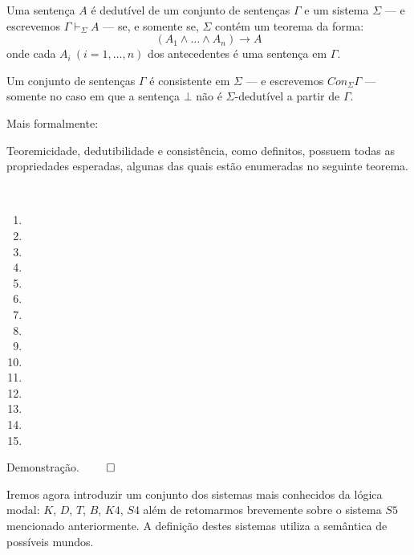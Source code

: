 Uma sentença $A$ é dedutível de um conjunto de
sentenças $\Gamma$ e um sistema $\Sigma$ --- e escrevemos $\Gamma
\vdash_{\Sigma} A$ --- se, e somente se, $\Sigma$ contém um teorema da forma:
\begin{equation}
    (A_1 \wedge \ldots \wedge A_n) \rightarrow A
\end{equation}
onde cada $A_i~(i=1,\ldots,n)$ dos antecedentes é uma sentença em $\Gamma$.

Um conjunto de sentenças $\Gamma$ é consistente em $\Sigma$ --- e escrevemos
$Con_{\Sigma}\Gamma$ --- somente no caso em que a sentença $\bot$ não é
$\Sigma$-dedutível a partir de $\Gamma$.

Mais formalmente:

\begin{definition}[Dedutibilidade]
    
\end{definition}

\begin{definition}[Consistência]
    
\end{definition}

Teoremicidade, dedutibilidade e consistência, como definitos, possuem todas as
propriedades esperadas, algunas das quais estão enumeradas no seguinte teorema.

\begin{theorem} ~
    \begin{enumerate}
        \item 
        \item 
        \item 
        \item 
        \item 
        \item 
        \item 
        \item 
        \item 
        \item 
        \item 
        \item 
        \item 
        \item 
        \item 
    \end{enumerate}
\end{theorem}

Demonstração. $\qed$

Iremos agora introduzir um conjunto dos sistemas mais conhecidos da lógica
modal: $K$, $D$, $T$, $B$, $K4$, $S4$ além de retomarmos brevemente sobre o
sistema $S5$ mencionado anteriormente. A definição destes sistemas utiliza a
semântica de possíveis mundos.

